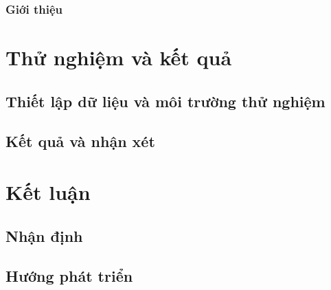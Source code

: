 \documentclass{article}
\begin{document}
\begin{flushleft}
        \subsubsection{Giới thiệu}
        \newpage
        \section{Thử nghiệm và kết quả}
        \subsection{Thiết lập dữ liệu và môi trường thử nghiệm}
        \subsection{Kết quả và nhận xét}
        \newpage
        \section{Kết luận}
        \subsection{Nhận định}
        \subsection{Hướng phát triển}
    \end{flushleft}
    \newpage
     
    
\end{document}

